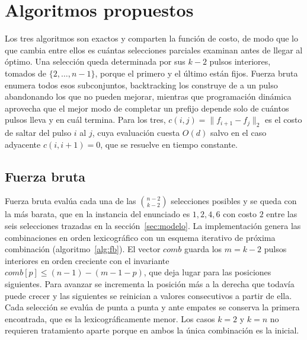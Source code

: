 
\section{Algoritmos propuestos}
\label{sec:algoritmos}

Los tres algoritmos son exactos y comparten la función de costo, de modo que lo que cambia entre ellos es cuántas selecciones parciales examinan antes de llegar al óptimo. Una selección queda determinada por sus $k-2$ pulsos interiores, tomados de $\{2, \ldots, n-1\}$, porque el primero y el último están fijos. Fuerza bruta enumera todos esos subconjuntos, backtracking los construye de a un pulso abandonando los que no pueden mejorar, mientras que programación dinámica aprovecha que el mejor modo de completar un prefijo depende solo de cuántos pulsos lleva y en cuál termina. Para los tres, $c(i,j) = \lVert f_{i+1} - f_j \rVert_2$ es el costo de saltar del pulso $i$ al $j$, cuya evaluación cuesta $O(d)$ salvo en el caso adyacente $c(i,i+1) = 0$, que se resuelve en tiempo constante.

\subsection{Fuerza bruta}
\label{sec:fb}

Fuerza bruta evalúa cada una de las $\binom{n-2}{k-2}$ selecciones posibles y se queda con la más barata, que en la instancia del enunciado es $1, 2, 4, 6$ con costo $2$ entre las seis selecciones trazadas en la sección~\ref{sec:modelo}. La implementación genera las combinaciones en orden lexicográfico con un esquema iterativo de próxima combinación (algoritmo~\ref{alg:fb}). El vector $\mathit{comb}$ guarda los $m = k-2$ pulsos interiores en orden creciente con el invariante $\mathit{comb}[p] \le (n-1) - (m-1-p)$, que deja lugar para las posiciones siguientes. Para avanzar se incrementa la posición más a la derecha que todavía puede crecer y las siguientes se reinician a valores consecutivos a partir de ella. Cada selección se evalúa de punta a punta y ante empates se conserva la primera encontrada, que es la lexicográficamente menor. Los casos $k = 2$ y $k = n$ no requieren tratamiento aparte porque en ambos la única combinación es la inicial.

